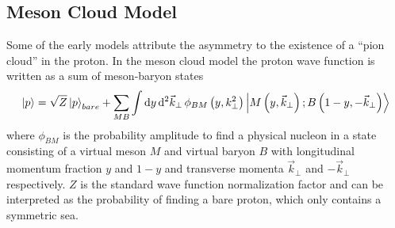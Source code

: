 \documentclass[../main.tex]{subfiles}
\begin{document}
\subsection{Meson Cloud Model}
Some of the early models attribute the asymmetry to the existence of a ``pion cloud'' in the proton.
In the meson cloud model \cite{kumano1998} the proton wave function is written as a sum of meson-baryon states
\begin{equation}
	\ket{p} = \sqrt{Z}\ket{p}_{bare} + \sum_{MB}\int \dd{y} \dd[2]{\vec{k}_\perp} \phi_{BM} \left(y, k^2_\perp\right)\ket{M\left(y, \vec{k}_\perp\right);B\left(1-y, -\vec{k}_\perp\right)}
\end{equation}
where $\phi_{BM}$ is the probability amplitude to find a physical nucleon in a state consisting of a virtual
meson $M$ and virtual baryon $B$ with longitudinal momentum fraction $y$ and $1-y$ and transverse momenta
$\vec{k}_\perp$ and $-\vec{k}_\perp$ respectively. $Z$ is the standard wave function normalization factor
and can be interpreted as the probability of finding a bare proton, which only contains a symmetric sea.
\end{document}
